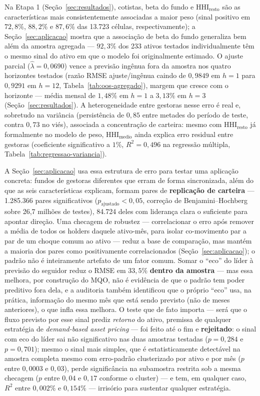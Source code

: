 \documentclass[11pt,a4paper]{article}
\begin{document}
Na Etapa 1 (Seção~\ref{sec:resultados}), cotistas, beta do fundo e $\text{HHI}_{\text{resto}}$
são as características mais consistentemente associadas a maior peso (sinal positivo em
$72{,}8\%$, $88{,}2\%$ e $87{,}6\%$ das 13.723 células, respectivamente); a
Seção~\ref{sec:aplicacao} mostra que a associação de beta do fundo generaliza bem além da amostra
agregada --- $92{,}3\%$ dos 233 ativos testados individualmente têm o mesmo sinal do ativo em que
o modelo foi originalmente estimado. O ajuste parcial ($\widehat\lambda=0{,}0690$) vence a
previsão ingênua fora da amostra nos quatro horizontes testados (razão RMSE ajuste/ingênua caindo
de $0{,}9849$ em $h=1$ para $0{,}9291$ em $h=12$, Tabela~\ref{tab:oos-agregado}), margem que
cresce com o horizonte --- média mensal de $1{,}48\%$ em $h=1$ a $3{,}13\%$ em $h=3$
(Seção~\ref{sec:resultados}). A heterogeneidade entre gestoras nesse erro é real e, sobretudo na
variância (persistência de $0{,}85$ entre metades do período de teste, contra $0{,}73$ no viés),
associada a concentração de carteira: mesmo com $\text{HHI}_{\text{resto}}$ já formalmente no
modelo de peso, $\text{HHI}_{\text{medio}}$ ainda explica erro residual entre gestoras
(coeficiente significativo a $1\%$, $R^2=0{,}496$ na regressão múltipla,
Tabela~\ref{tab:regressao-variancia}).

A Seção~\ref{sec:aplicacao} usa essa estrutura de erro para testar uma aplicação concreta: fundos
de gestoras diferentes que erram de forma sincronizada, além do que as seis características
explicam, formam pares de \textbf{replicação de carteira} --- 1.285.366 pares significativos
($p_{\text{ajustado}}<0{,}05$, correção de Benjamini--Hochberg sobre 26,7 milhões de testes),
84.724 deles com liderança clara o suficiente para apontar direção. Uma checagem de robustez
--- correlacionar o erro após remover a média de todos os holders daquele ativo-mês, para isolar
co-movimento par a par de um choque comum ao ativo --- reduz a base de comparação, mas mantém a
maioria dos pares como positivamente correlacionados (Seção~\ref{sec:aplicacao}); o padrão não é
inteiramente artefato de um fator comum. Somar o ``eco'' do líder à previsão do seguidor reduz o
RMSE em $33{,}5\%$ \textbf{dentro da amostra} --- mas essa melhora, por construção do MQO, não é
evidência de que o padrão tem poder preditivo fora dela, e a auditoria também identificou que o
próprio ``eco'' usa, na prática, informação do mesmo mês que está sendo previsto (não de meses
anteriores), o que infla essa melhora. O teste que de fato importa --- será que o fluxo previsto
por esse sinal prediz \emph{retorno} do ativo, premissa de qualquer estratégia de
\emph{demand-based asset pricing} --- foi feito até o fim e \textbf{rejeitado}: o sinal com eco
do líder sai não significativo nas duas amostras testadas ($p=0{,}284$ e $p=0{,}701$); mesmo o
sinal mais simples, que é estatisticamente detectável na amostra completa mesmo com erro-padrão
clusterizado por ativo e por mês ($p$ entre $0{,}0003$ e $0{,}03$), perde significância na
subamostra restrita sob a mesma checagem ($p$ entre $0{,}04$ e $0{,}17$ conforme o cluster) --- e
tem, em qualquer caso, $R^2$ entre $0{,}002\%$ e $0{,}154\%$ --- irrisório para sustentar
qualquer estratégia.
\end{document}
